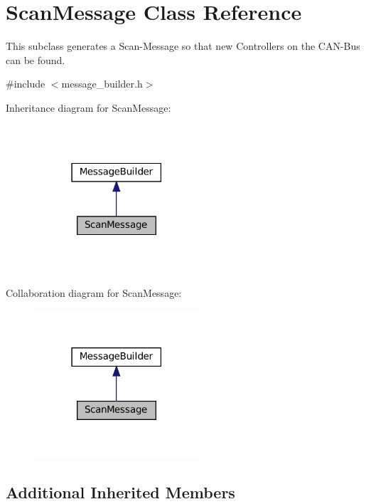 \hypertarget{classScanMessage}{}\section{Scan\+Message Class Reference}
\label{classScanMessage}


This subclass generates a Scan-\/\+Message so that new Controllers on the C\+A\+N-\/\+Bus can be found.  




{\ttfamily \#include $<$message\+\_\+builder.\+h$>$}



Inheritance diagram for Scan\+Message\+:\nopagebreak
\begin{figure}[H]
\begin{center}
\leavevmode
\includegraphics[width=174pt]{classScanMessage__inherit__graph}
\end{center}
\end{figure}


Collaboration diagram for Scan\+Message\+:\nopagebreak
\begin{figure}[H]
\begin{center}
\leavevmode
\includegraphics[width=174pt]{classScanMessage__coll__graph}
\end{center}
\end{figure}
\subsection*{Additional Inherited Members}


